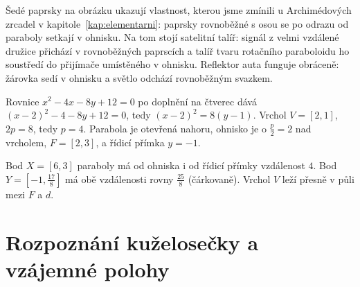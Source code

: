 Šedé paprsky na obrázku ukazují vlastnost, kterou jsme zmínili u Archimédových zrcadel v kapitole~\ref{kap:elementarni}: paprsky rovnoběžné s osou se po odrazu od paraboly setkají v ohnisku.
Na tom stojí satelitní talíř: signál z velmi vzdálené družice přichází v rovnoběžných paprscích a talíř tvaru rotačního paraboloidu ho soustředí do přijímače umístěného v ohnisku. Reflektor auta funguje obráceně: žárovka sedí v ohnisku a světlo odchází rovnoběžným svazkem.

\begin{example}
  Rovnice $x^2 - 4x - 8y + 12 = 0$ po doplnění na čtverec dává ${(x - 2)}^2 - 4 - 8y + 12 = 0$, tedy ${(x - 2)}^2 = 8(y - 1)$. Vrchol $V = [2, 1]$, $2p = 8$, tedy $p = 4$. Parabola je otevřená nahoru, ohnisko je o $\frac{p}{2} = 2$ nad vrcholem, $F = [2, 3]$, a řídicí přímka $y = -1$.
\end{example}

\begin{center}
\end{center}
Bod $X = [6, 3]$ paraboly má od ohniska i od řídicí přímky vzdálenost $4$. Bod $Y = \left[-1, \frac{17}{8}\right]$ má obě vzdálenosti rovny $\frac{25}{8}$ (čárkovaně). Vrchol $V$ leží přesně v půli mezi $F$ a $d$.

\section{Rozpoznání kuželosečky a vzájemné polohy}\label{sec:rozpoznani-kuzelosecky}

